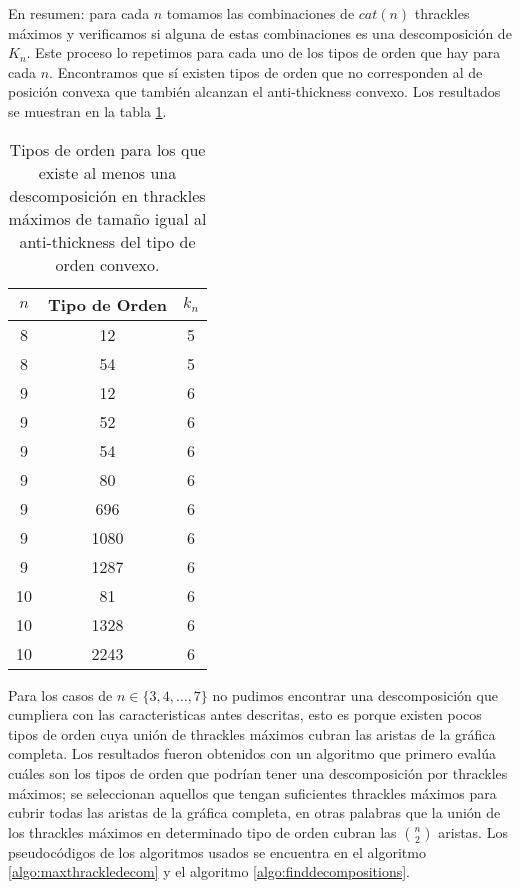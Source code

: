 En resumen: para cada $n$ tomamos las combinaciones de $cat(n)$ thrackles máximos y
verificamos si alguna de estas combinaciones es una descomposición de $K_n$. Este proceso
lo repetimos para cada uno de los tipos de orden que hay para cada $n$.
Encontramos que sí existen tipos de orden que no corresponden al de posición convexa que también
alcanzan el anti-thickness convexo. Los resultados se muestran en la tabla \ref{table:res_desc_th_max}.
\begin{table}[t]
  \centering
  \begin{tabular}{|c|c|c|}
    \hline
    $n$   & Tipo de Orden & $k_n$ \\ \hline\hline
    8 & 12   & 5  \\
    8 & 54   & 5  \\ \hline
    9 & 12   & 6  \\
    9 & 52   & 6  \\
    9 & 54   & 6  \\
    9 & 80   & 6  \\
    9 & 696  & 6  \\
    9 & 1080 & 6  \\
    9 & 1287 & 6  \\ \hline
   10 & 81   & 6  \\
   10 & 1328 & 6  \\
   10 & 2243 & 6  \\ \hline
  \end{tabular}

  \caption{Tipos de orden para los que existe al menos una descomposición en thrackles máximos
  de tamaño igual al anti-thickness del tipo de orden convexo.}
  \label{table:res_desc_th_max}
\end{table}

Para los casos de $n \in \{3,4,\dots,7\}$ no pudimos encontrar una descomposición que cumpliera
con las caracteristicas antes descritas, esto es porque existen pocos tipos de orden
cuya unión de thrackles máximos cubran las aristas de la gráfica completa.
Los resultados fueron obtenidos con un algoritmo que primero evalúa
cuáles son los tipos de orden que podrían tener una descomposición por thrackles máximos;
se seleccionan aquellos que tengan suficientes thrackles máximos para cubrir todas las
aristas de la gráfica completa, en otras palabras que la unión de los thrackles
máximos en determinado tipo de orden cubran las $\binom{n}{2}$ aristas. Los pseudocódigos
de los algoritmos usados se encuentra en el algoritmo \ref{algo:maxthrackledecom} y
el algoritmo \ref{algo:finddecompositions}.


